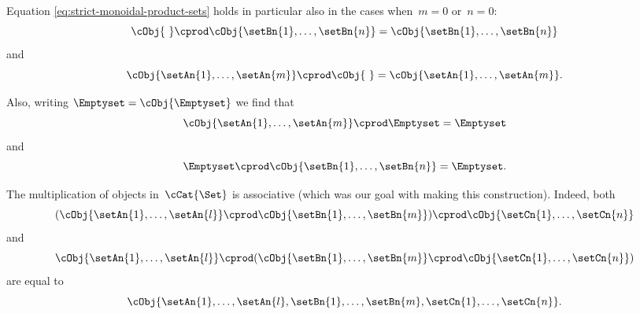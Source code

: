 Equation \cref{eq:strict-monoidal-product-sets} holds in particular also in the cases when~$m = 0$ or~$n =0$:
\begin{equation*}
    \cObj{ \ } \cprod \cObj{\setBn{1}, \ldots, \setBn{n}} = \cObj{\setBn{1}, \ldots, \setBn{n}}
\end{equation*}
and
\begin{equation*}
    \cObj{\setAn{1}, \ldots, \setAn{m}} \cprod \cObj{ \ } = \cObj{\setAn{1}, \ldots, \setAn{m}}.
\end{equation*}

Also, writing $\Emptyset = \cObj{\Emptyset}$ we find that
\begin{equation*}
    \cObj{\setAn{1}, \ldots, \setAn{m}} \cprod \Emptyset = \Emptyset
\end{equation*}
and
\begin{equation*}
    \Emptyset \cprod \cObj{\setBn{1}, \ldots, \setBn{n}} = \Emptyset.
\end{equation*}

\begin{remark}
    The multiplication of objects in~$\cCat{\Set}$ is associative (which was our goal with making this construction).
    Indeed, both
    \begin{equation*}
        ( \cObj{\setAn{1}, \ldots, \setAn{l}} \cprod \cObj{\setBn{1}, \ldots, \setBn{m}}) \cprod \cObj{\setCn{1}, \ldots, \setCn{n}}
    \end{equation*}
    and
    \begin{equation*}
        \cObj{\setAn{1}, \ldots, \setAn{l}} \cprod (\cObj{\setBn{1}, \ldots, \setBn{m}} \cprod \cObj{\setCn{1}, \ldots, \setCn{n}})
    \end{equation*}
    are equal to
    \begin{equation*}
        \cObj{\setAn{1}, \ldots, \setAn{l}, \setBn{1}, \ldots, \setBn{m}, \setCn{1}, \ldots, \setCn{n}}.
    \end{equation*}
\end{remark}

